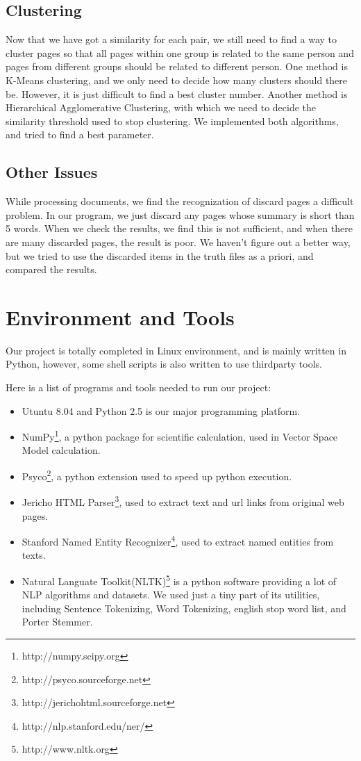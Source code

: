 \documentclass{article}
\begin{document}
\begin{CJK}{UTF8}{gbsn}
    \subsection{Clustering}
        Now that we have got a similarity for each pair, we still need to find a way to cluster pages so that all pages within one group is related to the same person and pages from different groups should be related to different person.
        One method is K-Means clustering, and we only need to decide how many clusters should there be. 
        However, it is just difficult to find a best cluster number.
        Another method is Hierarchical Agglomerative Clustering, with which we need to decide the similarity threshold used to stop clustering.
        We implemented both algorithms, and tried to find a best parameter.

    \subsection{Other Issues}
        While processing documents, we find the recognization of discard pages a difficult problem. 
        In our program, we just discard any pages whose summary is short than 5 words.
        When we check the results, we find this is not sufficient, and when there are many discarded pages, the result is poor.
        We haven't figure out a better way, but we tried to use the discarded items in the truth files as a priori, and compared the results.

\section{Environment and Tools}

    Our project is totally completed in Linux environment, and is mainly written in Python, however, some shell scripts is also written to use thirdparty tools.

    Here is a list of programs and tools needed to run our project:
    \begin{itemize}
    \item Utuntu 8.04 and Python 2.5 is our major programming platform.
    \item NumPy\footnote{http://numpy.scipy.org}, a python package for scientific calculation, used in Vector Space Model calculation.
    \item Psyco\footnote{http://psyco.sourceforge.net}, a python extension used to speed up python execution.
    \item Jericho HTML Parser\footnote{http://jerichohtml.sourceforge.net}, used to extract text and url links from original web pages.
    \item Stanford Named Entity Recognizer\footnote{http://nlp.stanford.edu/ner/}, used to extract named entities from texts.
    \item Natural Languate Toolkit(NLTK)\footnote{http://www.nltk.org} is a python software providing a lot of NLP algorithms and datasets. We used just a tiny part of its utilities, including Sentence Tokenizing, Word Tokenizing, english stop word list, and Porter Stemmer.
    \end{itemize}


\end{CJK}
\end{document}
